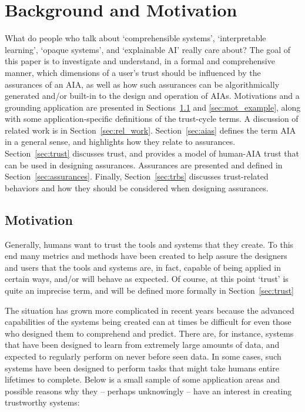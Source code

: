 \section{Background and Motivation} \label{sec:background}

What do people who talk about `comprehensible systems', `interpretable learning', `opaque systems', and `explainable AI' really care about? The goal of this paper is to investigate and understand, in a formal and comprehensive manner, which dimensions of a user's trust should be influenced by the assurances of an AIA, as well as how such assurances can be algorithmically generated and/or built-in to the design and operation of AIAs. Motivations and a grounding application are presented in Sections~\ref{sec:motivation} and \ref{sec:mot_example}, along with some application-specific definitions of the trust-cycle terms. A discussion of related work is in Section~\ref{sec:rel_work}. Section~\ref{sec:aias} defines the term AIA in a general sense, and highlights how they relate to assurances. Section~\ref{sec:trust} discusses trust, and provides a model of human-AIA trust that can be used in designing assurances. Assurances are presented and defined in Section~\ref{sec:assurances}. Finally, Section~\ref{sec:trbs} discusses trust-related behaviors and how they should be considered when designing assurances.

\subsection{Motivation} \label{sec:motivation}
    Generally, humans want to trust the tools and systems that they create.  To this end many metrics and methods have been created to help assure the designers and users that the tools and systems are, in fact, capable of being applied in certain ways, and/or will behave as expected. Of course, at this point `trust' is quite an imprecise term, and will be defined more formally in Section~\ref{sec:trust}

    The situation has grown more complicated in recent years because the advanced capabilities of the systems being created can at times be difficult for even those who designed them to comprehend and predict. There are, for instance, systems that have been designed to learn from extremely large amounts of data, and expected to regularly perform on never before seen data. In some cases, such systems have been designed to perform tasks that might take humans entire lifetimes to complete. Below is a small sample of some application areas and possible reasons why they -- perhaps unknowingly -- have an interest in creating trustworthy systems:

